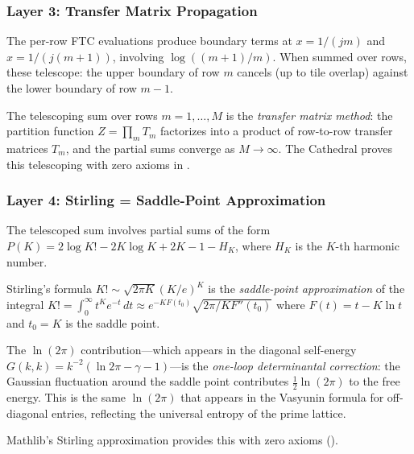 \subsubsection{Layer 3: Transfer Matrix Propagation}

The per-row FTC evaluations produce boundary terms at $x = 1/(jm)$
and $x = 1/(j(m+1))$, involving $\log((m+1)/m)$. When summed over
rows, these telescope: the upper boundary of row $m$ cancels (up to
tile overlap) against the lower boundary of row $m-1$.

\begin{principle}
The telescoping sum over rows $m = 1, \ldots, M$ is the
\emph{transfer matrix method}: the partition function
$Z = \prod_{m} T_m$ factorizes into a product of row-to-row
transfer matrices $T_m$, and the partial sums
converge as $M \to \infty$. The Cathedral proves this telescoping
with zero axioms in .
\end{principle}

\subsubsection{Layer 4: Stirling = Saddle-Point Approximation}

The telescoped sum involves partial sums of the form
$P(K) = 2\log K! - 2K\log K + 2K - 1 - H_K$, where $H_K$ is
the $K$-th harmonic number.

\begin{correspondence}
Stirling's formula $K! \sim \sqrt{2\pi K}(K/e)^K$ is the
\emph{saddle-point approximation} of the integral
$K! = \int_0^\infty t^K e^{-t}\,dt \approx e^{-KF(t_0)}\sqrt{2\pi/KF''(t_0)}$
where $F(t) = t - K\ln t$ and $t_0 = K$ is the saddle point.

The $\ln(2\pi)$ contribution---which appears in the diagonal self-energy
$G(k,k) = k^{-2}(\ln 2\pi - \gamma - 1)$---is the \emph{one-loop
determinantal correction}: the Gaussian fluctuation around the saddle
point contributes $\tfrac{1}{2}\ln(2\pi)$ to the free energy.
This is the same $\ln(2\pi)$ that appears in the Vasyunin formula
for off-diagonal entries, reflecting the universal entropy of the
prime lattice.

Mathlib's Stirling approximation provides this with zero axioms
().
\end{correspondence}

